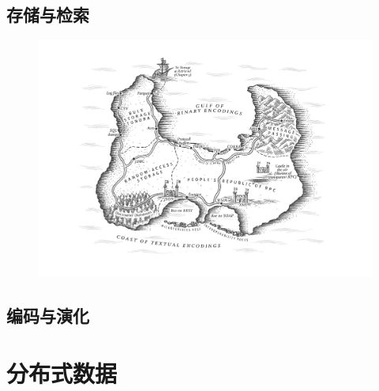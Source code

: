 \documentclass{book}
\begin{document}
\chapter{存储与检索}
\label{ch:ch3}


\newpage
\begin{figure}
  \centering
  \includegraphics[width=\textwidth]{img/ch4.png}
  \label{fig:ch4}
\end{figure}

\chapter{编码与演化}
\label{ch:ch4}

\part{分布式数据}
\label{part:part-2}
\end{document}
